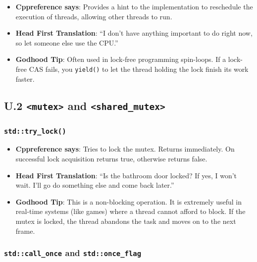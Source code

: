 \begin{itemize}
\tightlist
\item
  \textbf{Cppreference says}: Provides a hint to the implementation to
  reschedule the execution of threads, allowing other threads to run.
\item
  \textbf{Head First Translation}: ``I don't have anything important to
  do right now, so let someone else use the CPU.''
\item
  \textbf{Godhood Tip}: Often used in lock-free programming spin-loops.
  If a lock-free CAS fails, you \passthrough{\lstinline!yield()!} to let
  the thread holding the lock finish its work faster.
\end{itemize}

\hypertarget{u.2-mutex-and-shared_mutex}{%
\subsection{\texorpdfstring{U.2 \texttt{\textless{}mutex\textgreater{}}
and
\texttt{\textless{}shared\_mutex\textgreater{}}}{U.2 \textless mutex\textgreater{} and \textless shared\_mutex\textgreater{}}}\label{u.2-mutex-and-shared_mutex}}

\hypertarget{stdtry_lock}{%
\subsubsection{\texorpdfstring{\texttt{std::try\_lock()}}{std::try\_lock()}}\label{stdtry_lock}}

\begin{itemize}
\tightlist
\item
  \textbf{Cppreference says}: Tries to lock the mutex. Returns
  immediately. On successful lock acquisition returns true, otherwise
  returns false.
\item
  \textbf{Head First Translation}: ``Is the bathroom door locked? If
  yes, I won't wait. I'll go do something else and come back later.''
\item
  \textbf{Godhood Tip}: This is a non-blocking operation. It is
  extremely useful in real-time systems (like games) where a thread
  cannot afford to block. If the mutex is locked, the thread abandons
  the task and moves on to the next frame.
\end{itemize}

\hypertarget{stdcall_once-and-stdonce_flag}{%
\subsubsection{\texorpdfstring{\texttt{std::call\_once} and
\texttt{std::once\_flag}}{std::call\_once and std::once\_flag}}\label{stdcall_once-and-stdonce_flag}}

